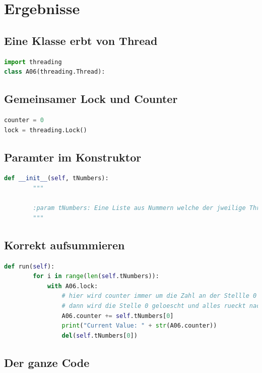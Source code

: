
\section{Ergebnisse}

\subsection{Eine Klasse erbt von Thread}

\begin{lstlisting}[language=python]
import threading
class A06(threading.Thread):
\end{lstlisting}

\subsection{Gemeinsamer Lock und Counter}
\begin{lstlisting}[language=python]
counter = 0
lock = threading.Lock()
\end{lstlisting}

\subsection{Paramter im Konstruktor}

\begin{lstlisting}[language=python]
    def __init__(self, tNumbers):
        """

        :param tNumbers: Eine Liste aus Nummern welche der jweilige Thread zo counter dazu addieren soll
        """
\end{lstlisting}

\subsection{Korrekt aufsummieren}

\begin{lstlisting}[language=python]
    def run(self):
        for i in range(len(self.tNumbers)):
            with A06.lock:
                # hier wird counter immer um die Zahl an der Stellle 0 der liste erhoeht
                # dann wird die Stelle 0 geloescht und alles rueckt nach links(2 -> 1, 1 -> 0, etc.)
                A06.counter += self.tNumbers[0]
                print("Current Value: " + str(A06.counter))
                del(self.tNumbers[0])
\end{lstlisting}
\clearpage
\subsection{Der ganze Code}

